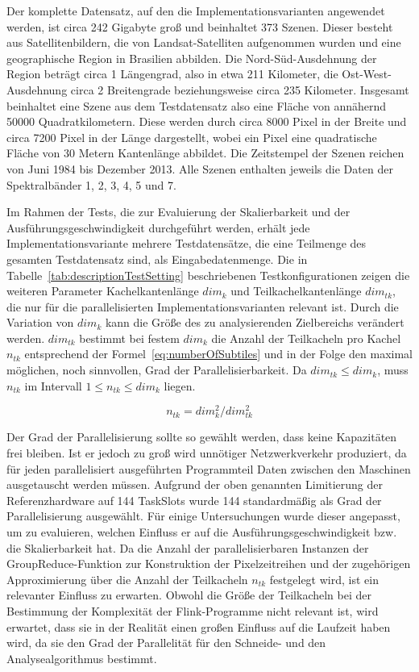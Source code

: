 Der komplette Datensatz, auf den die Implementationsvarianten angewendet werden, ist circa 242 Gigabyte groß und beinhaltet 373 Szenen. Dieser besteht aus Satellitenbildern, die von Landsat-Satelliten aufgenommen wurden und eine geographische Region in Brasilien abbilden. Die Nord-Süd-Ausdehnung der Region beträgt circa 1 Längengrad, also in etwa 211 Kilometer, die Ost-West-Ausdehnung circa 2 Breitengrade beziehungsweise circa 235 Kilometer. Insgesamt beinhaltet eine Szene aus dem Testdatensatz also eine Fläche von annähernd 50000 Quadratkilometern. Diese werden durch circa 8000 Pixel in der Breite und circa 7200 Pixel in der Länge dargestellt, wobei ein Pixel eine quadratische Fläche von 30 Metern Kantenlänge abbildet. Die Zeitstempel der Szenen reichen von Juni 1984 bis Dezember 2013. Alle Szenen enthalten jeweils die Daten der Spektralbänder 1, 2, 3, 4, 5 und 7.

Im Rahmen der Tests, die zur Evaluierung der Skalierbarkeit und der Ausführungsgeschwindigkeit durchgeführt werden, erhält jede Implementationsvariante mehrere Testdatensätze, die eine Teilmenge des gesamten Testdatensatz sind, als Eingabedatenmenge. Die in Tabelle~\ref{tab:descriptionTestSetting} beschriebenen Testkonfigurationen zeigen die weiteren Parameter Kachelkantenlänge $dim_k$  und Teilkachelkantenlänge $dim_{tk}$, die nur für die parallelisierten Implementationsvarianten relevant ist. Durch die Variation von $dim_k$ kann die Größe des zu analysierenden Zielbereichs verändert werden. $dim_{tk}$ bestimmt bei festem $dim_k$ die Anzahl der Teilkacheln pro Kachel $n_{tk}$ entsprechend der Formel~\ref{eq:numberOfSubtiles} und in der Folge den maximal möglichen, noch sinnvollen, Grad der Parallelisierbarkeit. Da $dim_{tk} \leq dim_k$, muss $n_{tk}$ im Intervall $1 \leq n_{tk} \leq dim_k$ liegen. 

\begin{equation} \label{eq:numberOfSubtiles}
n_{tk} = {dim_{k}^2} / {dim_{tk}^2}
\end{equation}

Der Grad der Parallelisierung sollte so gewählt werden, dass keine Kapazitäten frei bleiben. Ist er jedoch zu groß wird unnötiger Netzwerkverkehr produziert, da für jeden parallelisiert ausgeführten Programmteil Daten zwischen den Maschinen ausgetauscht werden müssen. Aufgrund der oben genannten Limitierung der Referenzhardware auf 144 TaskSlots wurde 144 standardmäßig als Grad der Parallelisierung ausgewählt. Für einige Untersuchungen wurde dieser angepasst, um zu evaluieren, welchen Einfluss er auf die Ausführungsgeschwindigkeit bzw. die Skalierbarkeit hat. Da die Anzahl der parallelisierbaren Instanzen der GroupReduce-Funktion zur Konstruktion der Pixelzeitreihen und der zugehörigen Approximierung über die Anzahl der Teilkacheln $n_{tk}$ festgelegt wird, ist ein relevanter Einfluss zu erwarten. Obwohl die Größe der Teilkacheln bei der Bestimmung der Komplexität der Flink-Programme nicht relevant ist, wird erwartet, dass sie in der Realität einen großen Einfluss auf die Laufzeit haben wird, da sie den Grad der Parallelität für den Schneide- und den Analysealgorithmus bestimmt.

